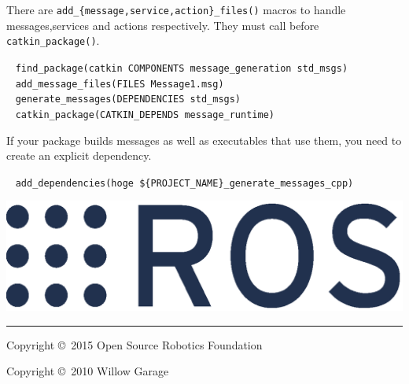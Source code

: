 \documentclass[10pt,landscape]{article}
\newif\ifcatkin
\begin{document}
\begin{multicols}{3}
There are \texttt{add\_\{message,service,action\}\_files()}
macros to handle messages,services and actions
respectively. They must call before \texttt{catkin\_package()}.
\vspace{-3.5mm}
\begin{tabbing}
~ \texttt{find\_package(catkin COMPONENTS message\_generation std\_msgs)}\\
~ \texttt{add\_message\_files(FILES Message1.msg)}\\
~ \texttt{generate\_messages(DEPENDENCIES std\_msgs)}\\
~ \texttt{catkin\_package(CATKIN\_DEPENDS message\_runtime)}\\
\end{tabbing}
\vspace{-5mm}
If your package builds messages as well as executables that use them,
you need to create an explicit dependency.
\vspace{-3.5mm}
\begin{tabbing}
~ \texttt{add\_dependencies(hoge \$\{PROJECT\_NAME\}\_generate\_messages\_cpp)}\\
\end{tabbing}

\vspace{-5mm}


\else %

\vspace{17cm}

\fi %

\begin{flushright}
\includegraphics[height=.12\columnwidth]{ros_logo.eps}
\end{flushright}

\vspace{-5mm}

\rule{0.3\linewidth}{0.25pt}

\scriptsize

Copyright \copyright\ 2015 Open Source Robotics Foundation

Copyright \copyright\ 2010 Willow Garage


\end{multicols}
\end{document}
